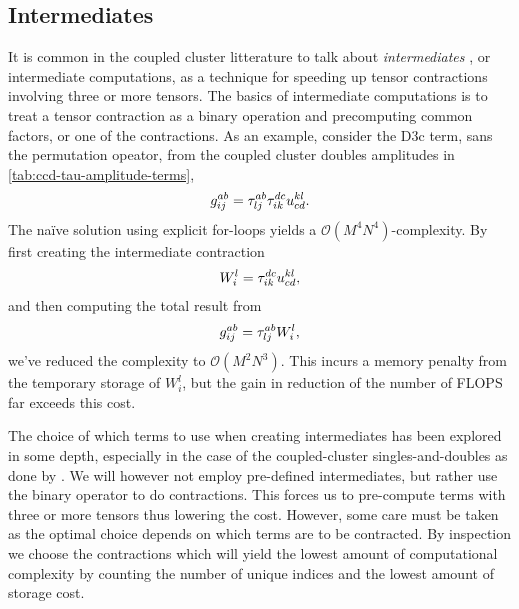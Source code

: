         \subsection{Intermediates}
            It is common in the coupled cluster litterature to talk about
            \emph{intermediates} \cite{hjorth2017advanced, gauss1995coupled}, or
            intermediate computations, as a technique for speeding up tensor
            contractions involving three or more tensors.
            The basics of intermediate computations is to treat a tensor
            contraction as a binary operation and precomputing common factors,
            or one of the contractions.
            As an example, consider the D3c term, sans the permutation opeator,
            from the coupled cluster doubles amplitudes in
            \autoref{tab:ccd-tau-amplitude-terms},
            \begin{align}
                g^{ab}_{ij} = \tau^{ab}_{lj} \tau^{dc}_{ik}
                u^{kl}_{cd}.
            \end{align}
            The naïve solution using explicit for-loops yields a
            $\mathcal{O}(M^4 N^4)$-complexity.
            By first creating the intermediate contraction
            \begin{align}
                W^{l}_{i} = \tau^{dc}_{ik} u^{kl}_{cd},
            \end{align}
            and then computing the total result from
            \begin{align}
                g^{ab}_{ij} = \tau^{ab}_{lj} W^{l}_{i},
            \end{align}
            we've reduced the complexity to $\mathcal{O}(M^2 N^3)$.
            This incurs a memory penalty from the temporary storage of
            $W^{l}_{i}$, but the gain in reduction of the number of FLOPS far
            exceeds this cost.

            The choice of which terms to use when creating intermediates has
            been explored in some depth, especially in the case of the
            coupled-cluster singles-and-doubles as done by
            \citeauthor{gauss1995coupled} \cite{gauss1995coupled}.
            We will however not employ pre-defined intermediates, but rather use
            the binary operator  \cite{numpy} to do
            contractions.
            This forces us to pre-compute terms with three or more tensors thus
            lowering the cost.
            However, some care must be taken as the optimal choice depends on
            which terms are to be contracted.
            By inspection we choose the contractions which will yield the lowest
            amount of computational complexity by counting the number of unique
            indices and the lowest amount of storage cost.


